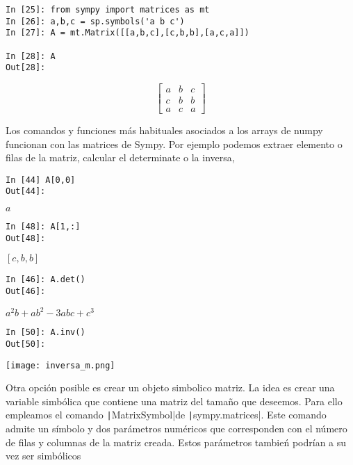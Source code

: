 \begin{center}
	\begin{minipage}{.5\textwidth}
		\begin{verbatim}
In [25]: from sympy import matrices as mt
In [26]: a,b,c = sp.symbols('a b c')
In [27]: A = mt.Matrix([[a,b,c],[c,b,b],[a,c,a]])
			
In [28]: A
Out[28]: 				
		\end{verbatim}
\[
\begin{bmatrix}
a&b&c\\
c&b&b\\
a&c&a
\end{bmatrix}
\]
	\end{minipage}
\end{center}

Los comandos y funciones más habituales asociados a los arrays de numpy funcionan con las matrices de Sympy. Por ejemplo podemos extraer elemento o filas de la matriz, calcular el determinate o la inversa,

\begin{center}
	\begin{minipage}{.5\textwidth}
		\begin{verbatim}
In [44] A[0,0]
Out[44]: 
\end{verbatim}
$a$	 				
\begin{verbatim}
In [48]: A[1,:]
Out[48]:
\end{verbatim}
$[c,b,b]$
\begin{verbatim}
In [46]: A.det()
Out[46]: 
\end{verbatim}
$a^2b+ab^2-3abc+c^3$
\begin{verbatim}
In [50]: A.inv()
Out[50]: 
\end{verbatim}
\texttt{[image: inversa\_m.png]}
	\end{minipage}
\end{center}

Otra opción posible es crear un objeto simbolico matriz. La idea es crear una variable simbólica que contiene una matriz del tamaño que deseemos. Para ello empleamos el comando \texttt|MatrixSymbol|de \texttt|sympy.matrices|. Este comando admite un símbolo y dos parámetros numéricos que corresponden con el número de filas y columnas de la matriz creada. Estos parámetros tambień podrían a su vez ser simbólicos

